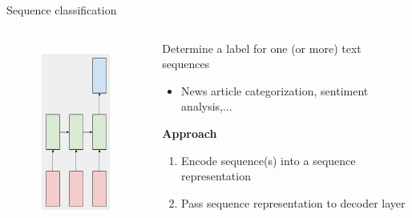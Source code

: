 \documentclass[12pt,aspectratio=169,handout]{beamer}
\begin{document}
\begin{frame}{Sequence classification}
	\begin{columns}[T] %
		\begin{column}{.49\textwidth}
		
			\begin{figure}[h]
			\includegraphics[height=6cm]{sequence_classification.pdf}
		\end{figure}
		
		\end{column}
		\begin{column}{.49\textwidth}
			\vspace{1cm}
			Determine a label for one (or more) text sequences
			\begin{itemize}
				\item News article categorization, sentiment analysis,... 
			\end{itemize}
			\pause
			\textbf{Approach}
			\begin{enumerate}
				\item Encode sequence(s) into a sequence representation
				\item Pass sequence representation to decoder layer
			\end{enumerate}
		\end{column}
	\end{columns}

\end{frame}
\end{document}
